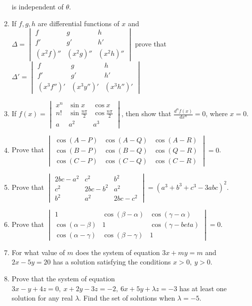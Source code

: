 \begin{enumerate}[resume]
  is independent of $\theta$.
\item If $f, g, h$ are differential functions of $x$ and $\Delta = \begin{vmatrix}f & g & h\\ f' & g' & h'\\(x^2f)'' & (x^2g)'' &
  (x^2h)''\end{vmatrix}$ prove that $\Delta' = \begin{vmatrix}f & g & h\\f' & g' & h'\\(x^3f'')' & (x^3y'')' &
    (x^3h'')'\end{vmatrix}$
\item If $f(x) = \begin{vmatrix}x^n & \sin x & \cos x\\n! & \sin\frac{n\pi}{2} & \cos\frac{n\pi}{2}\\a & a^2 & a^3\end{vmatrix}$,
  then show that $\frac{d^nf(x)}{dx^n} = 0$, where $x = 0$.
\item Prove that $\begin{vmatrix}\cos(A - P) & \cos(A - Q) & \cos(A - R)\\\cos(B - P) & \cos(B - Q) & \cos(Q - R)\\\cos(C - P) &
  \cos(C - Q) & \cos(C- R)\end{vmatrix} = 0$.
\item Prove that $\begin{vmatrix}2bc - a^2 & c^2 & b^2\\c^2 & 2bc - b^2 & a^2\\b^2 & a^2 & 2bc - c^2\end{vmatrix} = (a^3 + b^3 +
  c^3 - 3abc)^2$.
\item Prove that $\begin{vmatrix}1 & \cos(\beta - \alpha) & \cos(\gamma - \alpha)\\\cos(\alpha - \beta) & 1 & \cos(\gamma -
  beta)\\\cos(\alpha - \gamma) & \cos(\beta - \gamma) & 1\end{vmatrix} = 0.$
\item For what value of $m$ does the system of equation $3x + my = m$ and $2x - 5y = 20$ has a solution satisfying the conditions
  $x >0,\ y>0$.
\item Prove that the system of equation $3x - y + 4z = 0,\ x + 2y - 3z = -2,\ 6x + 5y + \lambda z = -3$ has at least one solution
  for any real $\lambda$. Find the set of solutions when $\lambda = -5$.

\end{enumerate}
